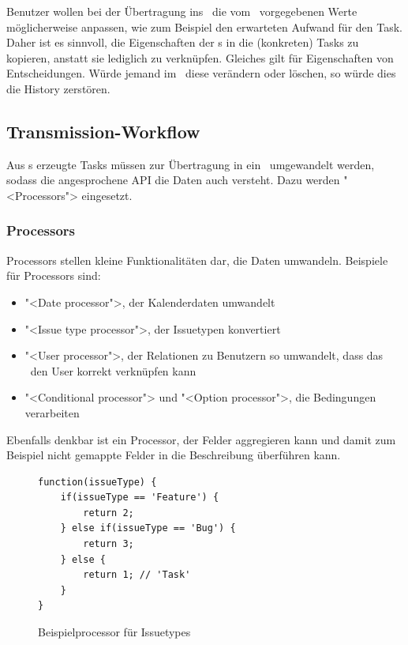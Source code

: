 				Benutzer wollen bei der Übertragung ins \ppt\ die vom \ttpl\ vorgegebenen Werte möglicherweise anpassen, wie zum Beispiel den erwarteten Aufwand für den Task.
				Daher ist es sinnvoll, die Eigenschaften der \ttpl s in die (konkreten) Tasks zu kopieren, anstatt sie lediglich zu verknüpfen.
				Gleiches gilt für Eigenschaften von Entscheidungen. Würde jemand im \dks\ diese verändern oder löschen,
				so würde dies die History zerstören.
			
		
		\subsection{Transmission-Workflow}
			\label{subsec:transmissionWorkflow}		
		
			Aus \ttpl s erzeugte Tasks müssen zur Übertragung in ein \ppt\
			umgewandelt werden, sodass die angesprochene API die Daten auch versteht. 
			Dazu werden "<Processors"> eingesetzt.
			
			\subsubsection{Processors}
			Processors stellen kleine Funktionalitäten dar, die Daten umwandeln.
			Beispiele für Processors sind:
			
			\begin{itemize}
				\item "<Date processor">, der Kalenderdaten umwandelt
				\item "<Issue type processor">, der Issuetypen konvertiert
				\item "<User processor">, der Relationen zu Benutzern so umwandelt, dass das \ppt\ den User korrekt verknüpfen kann
				\item "<Conditional processor"> und "<Option processor">, die Bedingungen verarbeiten
			\end{itemize}
			
			Ebenfalls denkbar ist ein Processor, der Felder aggregieren kann und damit zum Beispiel nicht gemappte Felder in die Beschreibung überführen kann.
			
			\begin{figure}[H]
				\begin{lstlisting}
function(issueType) {
	if(issueType == 'Feature') {
		return 2;
	} else if(issueType == 'Bug') {
		return 3;
	} else {
		return 1; // 'Task'
	}
}
				\end{lstlisting}
				\centering
				\caption{Beispielprocessor für Issuetypes}
				\label{fig:exampleProcessorCodeForIssueTypes}
			\end{figure}
			
